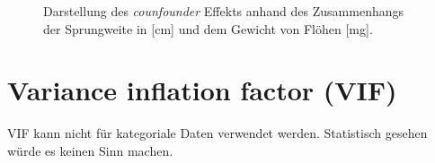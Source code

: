 \documentclass[
  letterpaper,
]{scrbook}
\begin{document}
\begin{figure}
\begin{minipage}[t]{0.33\linewidth}
{{}

}

\end{minipage}%
%
\begin{minipage}[t]{0.33\linewidth}

{\centering 


}

\end{minipage}%

\caption{\label{fig-stat-modeling-mult-01}Darstellung des
\emph{counfounder} Effekts anhand des Zusammenhangs der Sprungweite in
{[}cm{]} und dem Gewicht von Flöhen {[}mg{]}.}

\end{figure}

\hypertarget{variance-inflation-factor-vif}{%
\section{Variance inflation factor
(VIF)}\label{variance-inflation-factor-vif}}

VIF kann nicht für kategoriale Daten verwendet werden. Statistisch
gesehen würde es keinen Sinn machen.
\end{document}
